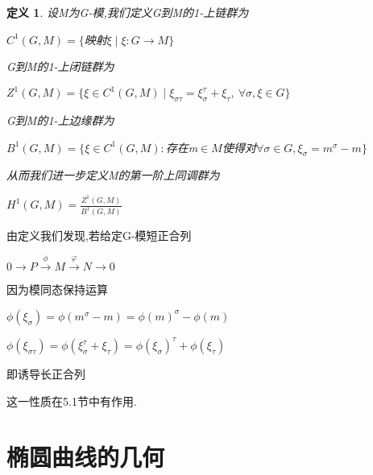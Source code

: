 \documentclass[11pt]{ctexart}
\newtheorem{defi}{定义}[section]
\begin{document}
\begin{defi}
  设M为G-模,我们定义G到M的1-上链群为
  \begin{center}
    $C^1(G,M)=\{$映射$\xi\mid \xi: G\rightarrow M \}$
  \end{center}
  \noindent G到M的1-上闭链群为
  \begin{center}
    $Z^1(G,M)=\{\xi \in C^1(G,M)\mid\xi_{\sigma\tau}=\xi_{\sigma}^{\tau}+\xi_{\tau},~\forall\sigma$$, \xi \in G\}$
  \end{center}
  \noindent G到M的1-上边缘群为
  \begin{center}
    $B^1(G,M)=\{\xi \in C^1(G,M):$存在m$\in M$使得对$\forall\sigma \in G$$, \xi_{\sigma}=m^{\sigma}-m\}$

  \end{center}

  \noindent 从而我们进一步定义M的第一阶上同调群为
  \begin{center}
    $H^1(G,M)=\frac{Z^1(G,M)}{B^1(G,M)}$
  \end{center}
\end{defi}

\noindent 由定义我们发现,若给定G-模短正合列
\begin{center}
    $0 \rightarrow P\stackrel{\phi} {\rightarrow} M \stackrel{\varphi} {\rightarrow}  N \rightarrow 0$
\end{center}
\noindent 因为模同态保持运算
\begin{center}
    $\phi(\xi_{\sigma})=\phi(m^{\sigma}-m)=\phi(m)^{\sigma}-\phi(m)$

    $\phi(\xi_{\sigma\tau})=\phi(\xi_{\sigma}^{\tau}+\xi_{\tau})=\phi(\xi_{\sigma})^{\tau}+\phi(\xi_{\tau})$
\end{center}
即诱导长正合列
\begin{center}
    
\end{center}
\noindent 这一性质在5.1节中有作用.
\section{椭圆曲线的几何}
\end{document}
